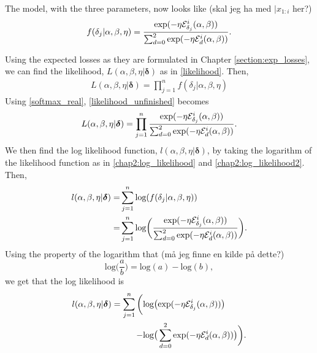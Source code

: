 The model, with the three parameters, now looks like (skal jeg ha med $|x_{1:i}$ her?)
\begin{equation}
\label{softmax_real}
    f(\delta_{j}|\alpha, \beta,\eta) = \frac{\text{exp}(- \eta \mathcal{E}^i_{\delta_{j}}(\alpha, \beta))}{\sum_{d=0}^{2} \text{exp}(-\eta \mathcal{E}^i_{d}(\alpha, \beta))}. 
\end{equation}

Using the expected losses as they are formulated in Chapter \ref{section:exp_losses}, we can find the likelihood, $L(\alpha,\beta,\eta|\boldsymbol{\delta})$ as in \eqref{likelihood}. Then, 
\begin{equation}
\label{likelihood_unfinished}
    \begin{aligned}
       L(\alpha,\beta,\eta|\boldsymbol{\delta}) = \prod_{j=1}^n f(\delta_j|\alpha,\beta,\eta)
    \end{aligned}
\end{equation}
Using \eqref{softmax_real}, \eqref{likelihood_unfinished} becomes
\begin{equation}
\label{likelihood_softmax}
    L(\alpha,\beta,\eta|\boldsymbol{\delta}) = \prod_{j=1}^n \frac{\text{exp}(- \eta \mathcal{E}^i_{\delta_{j}}(\alpha, \beta))}{\sum_{d=0}^{2} \text{exp}(-\eta \mathcal{E}^i_{d}(\alpha, \beta))}.
\end{equation}
We then find the log likelihood function, $l(\alpha,\beta,\eta|\boldsymbol{\delta})$, by taking the logarithm of the likelihood function as in \eqref{chap2:log_likelihood} and \eqref{chap2:log_likelihood2}. Then,
\begin{equation}
\label{log_likel_softmax_1}
    \begin{aligned}
       l(\alpha,\beta,\eta|\boldsymbol{\delta}) 
       =& \sum_{j=1}^n \text{log} (f(\delta_j|\alpha,\beta,\eta)) \\
       =& \sum_{j=1}^n \text{log} \bigg( \frac{\text{exp}(- \eta \mathcal{E}^i_{\delta_{j}}(\alpha, \beta))}{\sum_{d=0}^{2} \text{exp}(-\eta \mathcal{E}^i_{d}(\alpha, \beta))} \bigg).
    \end{aligned}
\end{equation}
Using the property of the logarithm that (må jeg finne en kilde på dette?)
\begin{equation}
    \text{log}\Big(\frac{a}{b} \Big) = \text{log}(a) - \text{log}(b),
\end{equation}
we get that the log likelihood is
\begin{equation}
\label{log_likel_softmax_2}
    \begin{aligned}
       l(\alpha,\beta,\eta|\boldsymbol{\delta}) 
       = \sum_{j=1}^n \bigg( &\text{log} \big( \text{exp}(- \eta \mathcal{E}^i_{\delta_{j}}(\alpha, \beta))\big)\\
       - &\text{log} \big( \sum_{d=0}^{2} \text{exp}(-\eta \mathcal{E}^i_{d}(\alpha, \beta)) \big)
       \bigg).
    \end{aligned}
\end{equation}
